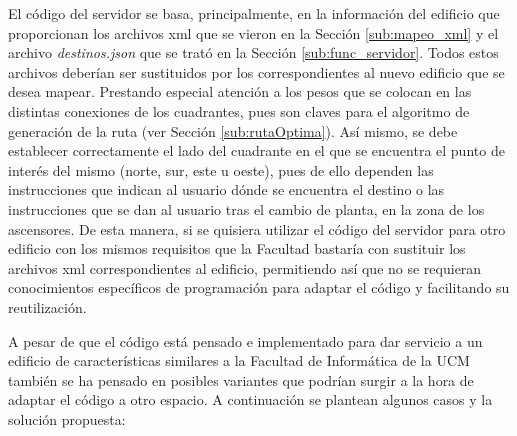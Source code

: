 El código del servidor se basa, principalmente, en la información del edificio que proporcionan los archivos xml que se vieron en la Sección \ref{sub:mapeo_xml} y el archivo \textit{destinos.json} que se trató en la Sección \ref{sub:func_servidor}. Todos estos archivos deberían ser sustituidos por los correspondientes al nuevo edificio que se desea mapear. Prestando especial atención a los pesos que se colocan en las distintas conexiones de los cuadrantes, pues son claves para el algoritmo de generación de la ruta (ver Sección \ref{sub:rutaOptima}). Así mismo, se debe establecer correctamente el lado del cuadrante en el que se encuentra el punto de interés del mismo (norte, sur, este u oeste), pues de ello dependen las instrucciones que indican al usuario dónde se encuentra el destino o las instrucciones que se dan al usuario tras el cambio de planta, en la zona de los ascensores. De esta manera, si se quisiera utilizar el código del servidor para otro edificio con los mismos requisitos que la Facultad bastaría con sustituir los archivos xml correspondientes al edificio, permitiendo así que no se requieran conocimientos específicos de programación para adaptar el código y facilitando su reutilización.

A pesar de que el código está pensado e implementado para dar servicio a un edificio de características similares a la Facultad de Informática de la UCM también se ha pensado en posibles variantes que podrían surgir a la hora de adaptar el código a otro espacio. A continuación se plantean algunos casos y la solución propuesta: 

